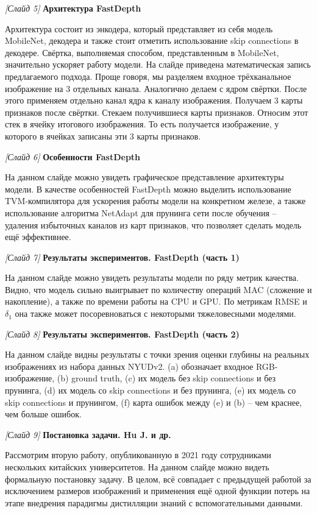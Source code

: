 \documentclass[a4paper, 14pt]{extarticle}
\begin{document}
	
	\textit{[Слайд 5]} \textbf{Архитектура FastDepth}
	
	Архитектура состоит из энкодера, который представляет из себя модель MobileNet, декодера и также стоит отметить использование skip connections в декодере. Свёртка, выполняемая способом, представленным в MobileNet, значительно ускоряет работу модели. На слайде приведена математическая запись предлагаемого подхода. Проще говоря, мы разделяем входное трёхканальное изображение на 3 отдельных канала. Аналогично делаем с ядром свёртки. После этого применяем отдельно канал ядра к каналу изображения. Получаем 3 карты признаков после свёртки. Стекаем получившиеся карты признаков. Относим этот стек в ячейку итогового изображения. То есть получается изображение, у которого в ячейках записаны эти 3 карты признаков.
	\bigskip
	
	
	\textit{[Слайд 6]} \textbf{Особенности FastDepth}
	
	На данном слайде можно увидеть графическое представление архитектуры модели. В качестве особенностей FastDepth можно выделить использование TVM-компилятора для ускорения работы модели на конкретном железе, а также использование алгоритма NetAdapt для прунинга сети после обучения -- удаления избыточных каналов из карт признаков, что позволяет сделать модель ещё эффективнее. 
	\bigskip


	\textit{[Слайд 7]} \textbf{Результаты экспериментов. FastDepth (часть 1)}
	
	На данном слайде можно увидеть результаты модели по ряду метрик качества. Видно, что модель сильно выигрывает по количеству операций MAC (сложение и накопление), а также по времени работы на CPU и GPU. По метрикам RMSE и $\delta_1$ она также может посоревноваться с некоторыми тяжеловесными моделями. 
	\bigskip


	\textit{[Слайд 8]} \textbf{Результаты экспериментов. FastDepth (часть 2)}
	
	На данном слайде видны результаты с точки зрения оценки глубины на реальных изображениях из набора данных NYUDv2. (a) обозначает входное RGB-изображение, (b) ground truth, (c) их модель без skip connections и без прунинга, (d) их модель со skip connections и без прунинга, (e) их модель со skip connections и прунингом, (f) карта ошибок между (e) и (b) -- чем краснее, чем больше ошибок. 
	\bigskip
	
	
	\textit{[Слайд 9]} \textbf{Постановка задачи. Hu J. и др.}
	
	Рассмотрим вторую работу, опубликованную в 2021 году сотрудниками нескольких китайских университетов. На данном слайде можно видеть формальную постановку задачу. В целом, всё совпадает с предыдущей работой за исключением размеров изображений и применения ещё одной функции потерь на этапе внедрения парадигмы дистилляции знаний с вспомогательными данными.
	\bigskip
	
\end{document}
